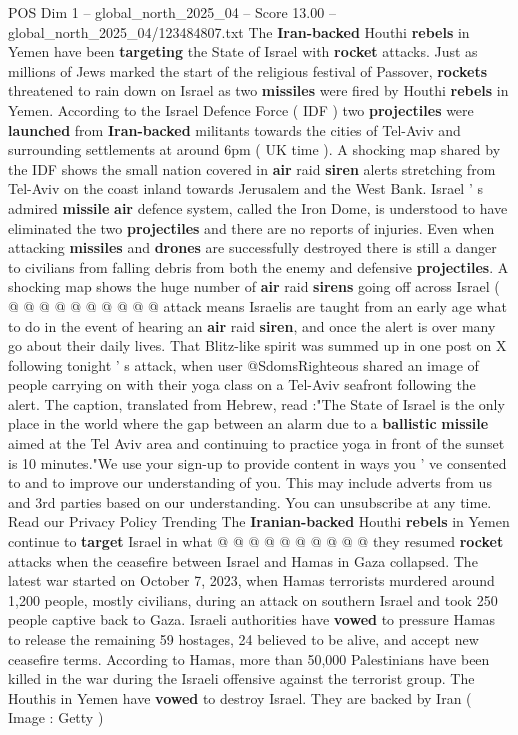 \begin{textsample}{POS Dim 1 – global\_north\_2025\_04 – Score 13.00 – global\_north\_2025\_04/123484807.txt}  \label{ex:f1_pos_417}
The \textbf{Iran-backed} Houthi \textbf{rebels} in Yemen have been \textbf{targeting} the State of Israel with \textbf{rocket} attacks.
Just as millions of Jews marked the start of the religious festival of Passover, \textbf{rockets} threatened to rain down on Israel as two \textbf{missiles} were fired by Houthi \textbf{rebels} in Yemen.
According to the Israel Defence Force ( IDF ) two \textbf{projectiles} were \textbf{launched} from \textbf{Iran-backed} militants towards the cities of Tel-Aviv and surrounding settlements at around 6pm ( UK time ).
A shocking map shared by the IDF shows the small nation covered in \textbf{air} raid \textbf{siren} alerts stretching from Tel-Aviv on the coast inland towards Jerusalem and the West Bank.
Israel ' s admired \textbf{missile} \textbf{air} defence system, called the Iron Dome, is understood to have eliminated the two \textbf{projectiles} and there are no reports of injuries.
Even when attacking \textbf{missiles} and \textbf{drones} are successfully destroyed there is still a danger to civilians from falling debris from both the enemy and defensive \textbf{projectiles}.
A shocking map shows the huge number of \textbf{air} raid \textbf{sirens} going off across Israel ( @ @ @ @ @ @ @ @ @ @ attack means Israelis are taught from an early age what to do in the event of hearing an \textbf{air} raid \textbf{siren}, and once the alert is over many go about their daily lives.
That Blitz-like spirit was summed up in one post on X following tonight ' s attack, when user @SdomsRighteous shared an image of people carrying on with their yoga class on a Tel-Aviv seafront following the alert.
The caption, translated from Hebrew, read :"The State of Israel is the only place in the world where the gap between an alarm due to a \textbf{ballistic} \textbf{missile} aimed at the Tel Aviv area and continuing to practice yoga in front of the sunset is 10 minutes."We use your sign-up to provide content in ways you ' ve consented to and to improve our understanding of you.
This may include adverts from us and 3rd parties based on our understanding.
You can unsubscribe at any time.
Read our Privacy Policy Trending The \textbf{Iranian-backed} Houthi \textbf{rebels} in Yemen continue to \textbf{target} Israel in what @ @ @ @ @ @ @ @ @ @ they resumed \textbf{rocket} attacks when the ceasefire between Israel and Hamas in Gaza collapsed.
The latest war started on October 7, 2023, when Hamas terrorists murdered around 1,200 people, mostly civilians, during an attack on southern Israel and took 250 people captive back to Gaza.
Israeli authorities have \textbf{vowed} to pressure Hamas to release the remaining 59 hostages, 24 believed to be alive, and accept new ceasefire terms.
According to Hamas, more than 50,000 Palestinians have been killed in the war during the Israeli offensive against the terrorist group.
The Houthis in Yemen have \textbf{vowed} to destroy Israel.
They are backed by Iran ( Image : Getty )

\end{textsample}

